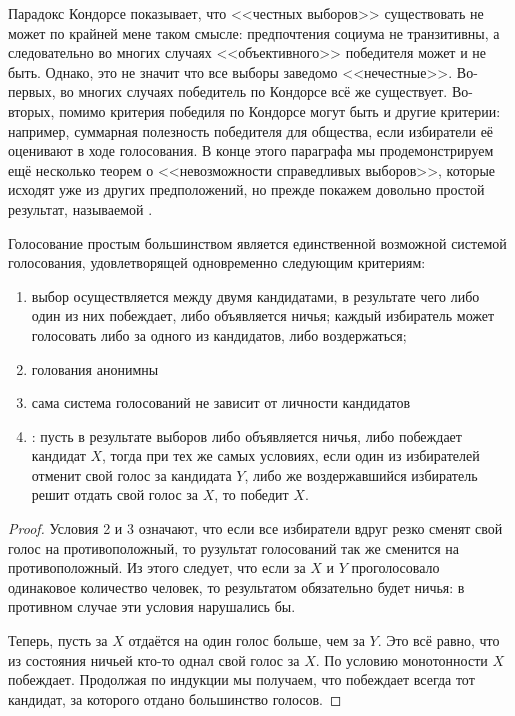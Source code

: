 Парадокс Кондорсе показывает, что <<честных выборов>> существовать не может по крайней мене таком смысле: предпочтения социума не транзитивны, а следовательно во многих случаях <<объективного>> победителя может и не быть. Однако, это не значит что все выборы заведомо <<нечестные>>. Во-первых, во многих случаях победитель по Кондорсе всё же существует. Во-вторых, помимо критерия победиля по Кондорсе могут быть и другие критерии: например, суммарная полезность победителя для общества, если избиратели её оценивают в ходе голосования. В конце этого параграфа мы продемонстрируем ещё несколько теорем о <<невозможности справедливых выборов>>, которые исходят уже из других предположений, но прежде покажем довольно простой результат, называемой .

\begin{thm}
Голосование простым большинством является единственной возможной системой голосования, удовлетворящей одновременно следующим критериям:
\begin{enumerate}
\item выбор осуществляется между двумя кандидатами, в результате чего либо один из них побеждает, либо объявляется ничья; каждый избиратель может голосовать либо за одного из кандидатов, либо воздержаться;
\item голования анонимны
\item сама система голосований не зависит от личности кандидатов
\item {}: пусть в результате выборов либо объявляется ничья, либо побеждает кандидат $X$, тогда при тех же самых условиях, если один из избирателей отменит свой голос за кандидата $Y$, либо же воздержавшийся избиратель решит отдать свой голос за $X$, то победит $X$.
\end{enumerate}
\end{thm}
\begin{proof}
Условия 2 и 3 означают, что если все избиратели вдруг резко сменят свой голос на противоположный, то рузультат голосований так же сменится на противоположный. Из этого следует, что если за $X$ и $Y$ проголосовало одинаковое количество человек, то результатом обязательно будет ничья: в противном случае эти условия нарушались бы.

Теперь, пусть за $X$ отдаётся на один голос больше, чем за $Y$. Это всё равно, что из состояния ничьей кто-то однал свой голос за $X$. По условию монотонности $X$ побеждает. Продолжая по индукции мы получаем, что побеждает всегда тот кандидат, за которого отдано большинство голосов.
\end{proof}

